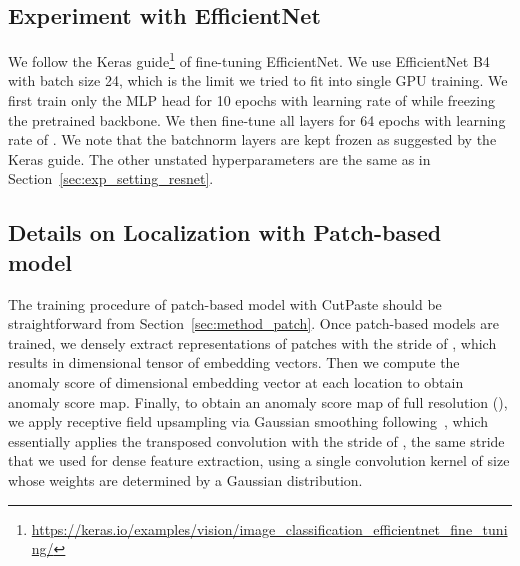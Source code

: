 \documentclass[final]{cvpr}
\begin{document}
\begin{table}[t]
    \label{tab:sensitivity_anal_cutpaste}
\end{table}



\subsection{Experiment with EfficientNet}
We follow the Keras guide\footnote{\url{https://keras.io/examples/vision/image_classification_efficientnet_fine_tuning/}} of fine-tuning EfficientNet. 
We use EfficientNet B4 with batch size 24, which is the limit we tried to fit into single GPU training. We first train only the MLP head for 10 epochs with learning rate of  while freezing the pretrained backbone. We then fine-tune all layers for 64 epochs with learning rate of . We note that the batchnorm layers are kept frozen as suggested by the Keras guide. The other unstated hyperparameters are the same as in Section~\ref{sec:exp_setting_resnet}.


\subsection{Details on Localization with Patch-based model}

The training procedure of patch-based model with CutPaste should be straightforward from Section~\ref{sec:method_patch}. 
Once patch-based models are trained, we densely extract representations of  patches with the stride of , which results in  dimensional tensor of embedding vectors.
Then we compute the anomaly score of  dimensional embedding vector at each location to obtain  anomaly score map. Finally, to obtain an anomaly score map of full resolution (), we apply receptive field upsampling via Gaussian smoothing following~\cite{liznerski2020explainable}, which essentially applies the transposed convolution with the stride of , the same stride that we used for dense feature extraction, using a single convolution kernel of size  whose weights are determined by a Gaussian distribution.
\end{document}
